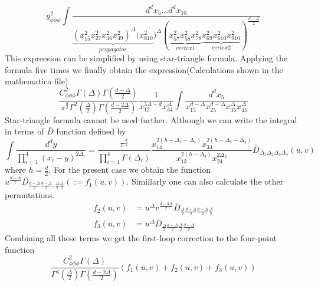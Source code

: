 \documentclass[12pt,a4paper,oneside]{book}
\theoremstyle{definition}
\begin{document}
        \begin{equation}
            g^{2}_{\phi\phi\phi}\int\frac{d^{d}x_{5}... d^{d}x_{10}}{\underbrace{(x^{2}_{15}x^{2}_{27}x^{2}_{36}x^{2}_{49})^{\Delta}(x^{2}_{810}}_{propagator})^{\Delta}(\underbrace{x^{2}_{57}x^{2}_{58}x^{2}_{78}}_{vertex 1}\underbrace{x^{2}_{69}x^{2}_{610}x^{2}_{910}}_{vertex 2})^{\frac{d-\Delta}{2}}}
        \end{equation}
        This expreesion can be simplified by using star-triangle formula. Applying the formula five times we finally obtain the expression(Calculations shown in the mathematica file)
        \begin{equation}
            \frac{C_{\phi\phi\phi}^2\Gamma(\Delta)\Gamma(\frac{d-\Delta}{2})}{\pi^{\frac{d}{2}}\Gamma^{2}(\frac{\Delta}{2})\Gamma(\frac{d-2\Delta}{2})}\frac{1}{x_{12}^{3\Delta-d}x_{34}^{\Delta}}\int \frac{d^{d}x_{5}}{x_{15}^{d-\Delta}x_{25}^{d-\Delta}x_{35}^{\Delta}x_{45}^{\Delta}} 
        \end{equation} 
        Star-triangle formula cannot be used further. Although we can write the integral in terms of $\bar{D}$ function defined by
        \begin{equation}\label{def:Dfunction}
            \int \frac{d^{d}y}{\prod_{i=1}^{4}(x_i - y)^{2\Delta_i}} = \frac{\pi^{\frac{d}{2}}}{\prod_{i=1}^{4}\Gamma(\Delta_i)} \frac{x_{14}^{2(h-\Delta_1-\Delta_4)}x_{34}^{2(h-\Delta_3-\Delta_4)}}{x_{13}^{2(h-\Delta_4)}x_{24}^{2\Delta_2}} \bar{D}_{\Delta_1\Delta_2\Delta_3\Delta_4}(u,v)
        \end{equation}
        where $h = \frac{d}{2}$. For the present case we obtain the function $ u^{\frac{d-\Delta}{2}}\bar{D}_{\frac{d-\Delta}{2}\frac{d-\Delta}{2},\frac{\Delta}{2}\frac{\Delta}{2}} (:= f_1(u,v))$. Simillarly one can also calculate the other permutations.
        \begin{align}\label{firstorder}
            f_2(u,v) &= u^{\Delta}v^{\frac{d-3\Delta}{2}} \bar{D}_{\frac{\Delta}{2}\frac{d-\Delta}{2}\frac{d-\Delta}{2}\frac{\Delta}{2}}\\
            f_3(u,v) &= u^{\Delta}\bar{D}_{\frac{\Delta}{2}\frac{d-\Delta}{2}\frac{\Delta}{2}\frac{d-\Delta}{2}} 
        \end{align}
        Combining all these terms we get the first-loop correction to the four-point function
        \begin{equation}\label{firstorderine}
            \frac{C_{\phi\phi\phi}^{2}\Gamma(\Delta)}{\Gamma^{4}(\frac{\Delta}{2})\Gamma(\frac{d-2\Delta}{2})}\left(f_1(u,v)+f_2(u,v)+f_3(u,v) \right)
        \end{equation}
\end{document}
